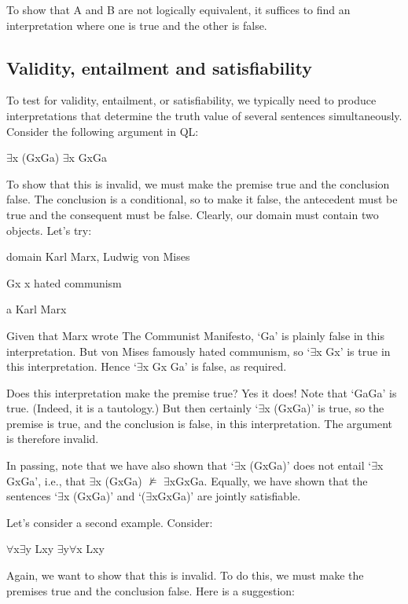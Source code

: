 To show that A and B are not logically equivalent, it suffices to find an interpretation where one is true and the other is false. 
\subsection{Validity, entailment and satisfiability}

To test for validity, entailment, or satisfiability, we typically need to produce interpretations that determine the truth value of several sentences simultaneously. Consider the following argument in QL:
\begin{center}
$\exists$x (Gx\eif Ga) \therefore $\exists$x Gx\eif Ga
\end{center}
To show that this is invalid, we must make the premise true and the conclusion false. The conclusion is a conditional, so to make it false, the antecedent must be true and the consequent must be false. Clearly, our domain must contain two objects. Let’s try:

\begin{ekey}\item[domain]  Karl Marx, Ludwig von Mises
\item[Gx] x hated communism
\item[a] Karl Marx
\end{ekey}
Given that Marx wrote The Communist Manifesto, ‘Ga’ is plainly false in this interpretation. But von Mises famously hated communism, so ‘$\exists$x Gx’ is true in this interpretation. Hence ‘$\exists$x Gx \eif Ga’ is false, as required.

Does this interpretation make the premise true? Yes it does! Note that ‘Ga\eif Ga’ is true. (Indeed, it is a tautology.) But then certainly ‘$\exists$x (Gx\eif Ga)’ is true, so the premise is true, and the conclusion is false, in this interpretation. The argument is therefore invalid.

In passing, note that we have also shown that ‘$\exists$x (Gx\eif Ga)’ does not entail ‘$\exists$x Gx\eif Ga’, i.e., that $\exists$x (Gx\eif Ga) $\nvDash$ $\exists$xGx\eif Ga. Equally, we have shown that the sentences ‘$\exists$x (Gx\eif Ga)’ and ‘\enot ($\exists$xGx\eif Ga)’ are jointly satisfiable.

Let’s consider a second example. Consider:

$\forall$x$\exists$y Lxy \therefore $\exists$y$\forall$x Lxy

Again, we want to show that this is invalid. To do this, we must make the premises true and the conclusion false. Here is a suggestion:

